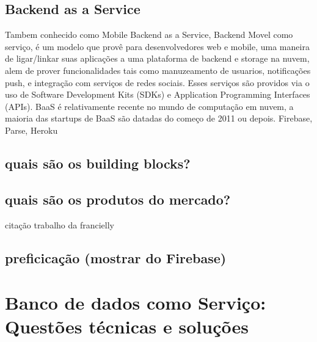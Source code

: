 \subsection{Backend as a Service}
	Tambem conhecido como Mobile Backend as a Service, Backend Movel como serviço, é um modelo que provê para desenvolvedores web e mobile, uma maneira de ligar/linkar suas aplicações a uma plataforma de backend e storage na nuvem, alem de prover funcionalidades tais como manuzeamento de usuarios, notificações push, e integração com serviços de redes sociais. Esses serviços são providos via o uso de Software Development Kits (SDKs) e Application Programming Interfaces (APIs). BaaS é relativamente recente no mundo de computação em nuvem, a maioria das startups de BaaS são datadas do começo de 2011 ou depois.
	Firebase, Parse, Heroku

	\subsection{quais são os building blocks?}
	\subsection{quais são os produtos do mercado?}
		citação trabalho da francielly
	\subsection{preficicação (mostrar do Firebase)}



\section{Banco de dados como Serviço: Questões técnicas e soluções}

